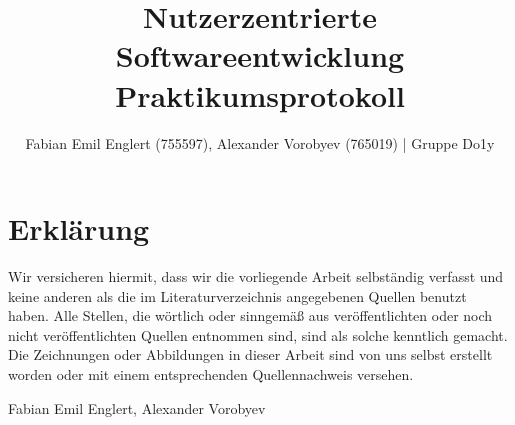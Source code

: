 \documentclass[utf8]{lni}
\begin{document}
\title[Praktikumsprotokoll]{Nutzerzentrierte Softwareentwicklung Praktikumsprotokoll}

\author[Fabian Emil Englert \and Alexander Vorobyev]
{Fabian Emil Englert (755597), Alexander Vorobyev (765019) | Gruppe Do1y}

\maketitle

\newpage
\tableofcontents
\newpage

\section{Erklärung}
Wir versicheren hiermit, dass wir die vorliegende Arbeit selbständig verfasst und keine anderen als die im Literaturverzeichnis angegebenen Quellen benutzt haben. Alle Stellen, die wörtlich oder sinngemäß aus veröffentlichten oder noch nicht veröffentlichten Quellen entnommen sind, sind als solche kenntlich gemacht. Die Zeichnungen oder Abbildungen in dieser Arbeit sind von uns selbst erstellt worden oder mit einem entsprechenden Quellennachweis versehen.


\begin{center}
	\centering Fabian Emil Englert, Alexander Vorobyev
\end{center}
\end{document}
